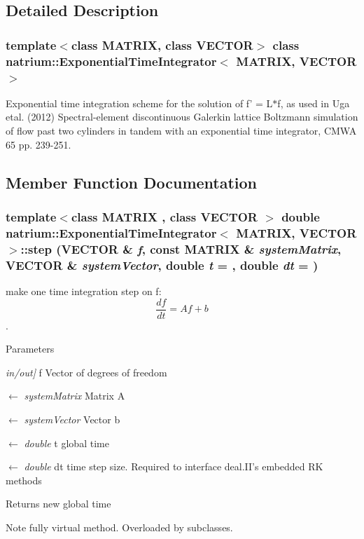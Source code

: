 \subsection{Detailed Description}
\subsubsection*{template$<$class MATRIX, class VECTOR$>$ class natrium::ExponentialTimeIntegrator$<$ MATRIX, VECTOR $>$}

Exponential time integration scheme for the solution of f' = L$\ast$f, as used in Uga etal. (2012) Spectral-\/element discontinuous Galerkin lattice Boltzmann simulation of flow past two cylinders in tandem with an exponential time integrator, CMWA 65 pp. 239-\/251. 

\subsection{Member Function Documentation}
\hypertarget{classnatrium_1_1ExponentialTimeIntegrator_a656810a85c20b5f7eae422ee596fc340}{
\subsubsection[{step}]{\setlength{\rightskip}{0pt plus 5cm}template$<$class MATRIX , class VECTOR $>$ double {\bf natrium::ExponentialTimeIntegrator}$<$ MATRIX, VECTOR $>$::step (VECTOR \& {\em f}, \/  const MATRIX \& {\em systemMatrix}, \/  VECTOR \& {\em systemVector}, \/  double {\em t} = {}, \/  double {\em dt} = {})}}
\label{classnatrium_1_1ExponentialTimeIntegrator_a656810a85c20b5f7eae422ee596fc340}


make one time integration step on f: \[ \frac{df}{dt} = Af+b \]. 
\begin{DoxyParams}{Parameters}
\item[{\em in/out\mbox{]}}]f Vector of degrees of freedom \item[\mbox{$\leftarrow$} {\em systemMatrix}]Matrix A \item[\mbox{$\leftarrow$} {\em systemVector}]Vector b \item[\mbox{$\leftarrow$} {\em double}]t global time \item[\mbox{$\leftarrow$} {\em double}]dt time step size. Required to interface deal.II's embedded RK methods \end{DoxyParams}
\begin{DoxyReturn}{Returns}
new global time 
\end{DoxyReturn}
\begin{DoxyNote}{Note}
fully virtual method. Overloaded by subclasses. 
\end{DoxyNote}


